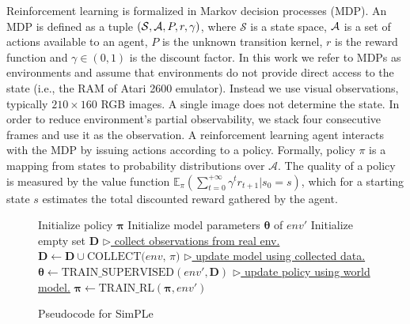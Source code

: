 Reinforcement learning is formalized in Markov decision processes (MDP). An MDP is defined as a tuple $(\mathcal{S}, {\mathcal A}, P, r, \gamma)$, where $\mathcal{S}$ is a state space, ${\mathcal A}$ is a set of actions available to an agent, $P$ is the unknown transition kernel, $r$ is the reward function and $\gamma\in (0,1)$ is the discount factor. 
In this work we refer to MDPs as environments and assume %
that environments do not provide direct access to the state (i.e., the RAM of Atari 2600 emulator). Instead we use visual observations, typically $210\times 160$ RGB images. A single image does not determine the state. 
In order to reduce environment's partial observability, we stack four consecutive frames and use it as the observation.
A reinforcement learning agent interacts with the MDP by issuing actions according to a policy. Formally, policy $\pi$ is a mapping from states to probability distributions over $\mathcal{A}$. The quality of a policy is measured by the value function $\mathbb{E}_{\pi}\left(\sum_{t=0}^{+\infty}\gamma^t r_{t+1}|s_0=s \right)$, which for a starting state $s$ estimates the total discounted reward gathered by the agent.

\begin{figure}
\removelatexerror
\vspace{-0.5cm}
\begin{algorithm}[H]
\caption{Pseudocode for SimPLe}\label{dpll}
\begin{algorithmic}
\STATE Initialize policy $\boldsymbol\pi$
\STATE Initialize model parameters $\boldsymbol\theta$ of $env'$
\STATE Initialize empty set $\mathbf{D}$
\STATE \underline{$\triangleright$ collect observations from real env.}
\STATE $\mathbf{D} \gets \mathbf{D} \cup \text{COLLECT($env$, $\pi$)}$
\STATE \underline{$\triangleright$ update model using collected data.}
\STATE $\boldsymbol\theta \gets \text{TRAIN\_SUPERVISED}(env', \mathbf{D})$
\STATE \underline{$\triangleright$ update policy using world model.}
\STATE $\boldsymbol\pi \gets \text{TRAIN\_RL}(\boldsymbol\pi, env')$
\ENDWHILE
\end{algorithmic}
\label{basic_loop}
\label{alg:basic_loop}
\end{algorithm}
\end{figure}

